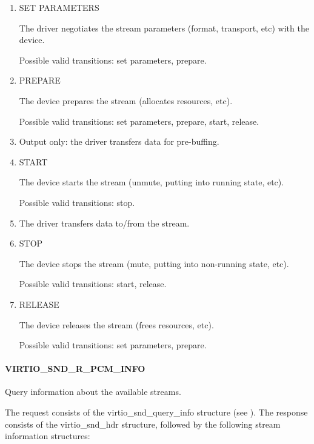 \begin{enumerate}
\item SET PARAMETERS

The driver negotiates the stream parameters (format, transport, etc) with
the device.

Possible valid transitions: set parameters, prepare.

\item PREPARE

The device prepares the stream (allocates resources, etc).

Possible valid transitions: set parameters, prepare, start, release.

\item Output only: the driver transfers data for pre-buffing.

\item START

The device starts the stream (unmute, putting into running state, etc).

Possible valid transitions: stop.

\item The driver transfers data to/from the stream.

\item STOP

The device stops the stream (mute, putting into non-running state, etc).

Possible valid transitions: start, release.

\item RELEASE

The device releases the stream (frees resources, etc).

Possible valid transitions: set parameters, prepare.

\end{enumerate}

\paragraph{VIRTIO_SND_R_PCM_INFO}

Query information about the available streams.

The request consists of the virtio_snd_query_info structure
(see ).
The response consists of the virtio_snd_hdr structure, followed by the following
stream information structures:

